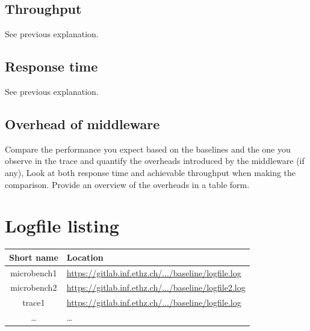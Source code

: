 \documentclass[11pt]{article}
\begin{document}
\subsection{Throughput}
See previous explanation.

\subsection{Response time}
See previous explanation.

\subsection{Overhead of middleware}

Compare the performance you expect based on the baselines and the one you observe in the trace and quantify the overheads introduced by the middleware (if any), Look at both response time and achievable throughput when making the comparison. Provide an overview of the overheads in a table form.


\pagebreak

\section*{Logfile listing}

\begin{tabular}{|c|l|}
\hline \textbf{Short name }& \textbf{Location} \\ 
\hline microbench1 & \url{https://gitlab.inf.ethz.ch/.../baseline/logfile.log} \\ 
\hline microbench2 & \url{https://gitlab.inf.ethz.ch/.../baseline/logfile2.log} \\ 
\hline trace1 & \url{https://gitlab.inf.ethz.ch/.../baseline/logfile.log} \\ 
\hline \dots & \dots \\ 
\hline 
\end{tabular} 
\end{document}
